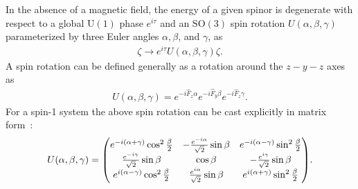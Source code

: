 In the absence of a magnetic field, the energy of a given spinor is degenerate
with respect to a global \(\text{U}(1)\) phase \(e^{i\tau}\) and an
\(\text{SO}(3)\) spin rotation \(U(\alpha, \beta, \gamma)\) parameterized by
three Euler angles \(\alpha, \beta \), and \(\gamma \), as
\begin{align}
    \zeta \rightarrow e^{i\tau}U(\alpha, \beta, \gamma)\zeta.
\end{align}
A spin rotation can be defined generally as a rotation around the \(z-y-z\) axes
as
\begin{align}\label{eq: general-spin-rot}
    U(\alpha, \beta, \gamma) = e^{-i\hat{F}_z\alpha}e^{-i\hat{F}_y\beta}
    e^{-i\hat{F}_z\gamma}.
\end{align}
For a spin-1 system the above spin rotation can be cast explicitly in matrix
form~\cite{Kawaguchi2012}:
\begin{align}\label{eq: spin1-rotation-matrix}
    U(\alpha, \beta, \gamma) = \mqty(
    e^{-i(\alpha + \gamma)}\cos^2\frac{\beta}{2} &
    -\frac{e^{-i\alpha}}{\sqrt{2}}\sin\beta &
    e^{-i(\alpha - \gamma)}\sin^2\frac{\beta}{2} \\
    \frac{e^{-i\gamma}}{\sqrt{2}}\sin\beta &
    \cos\beta &
    -\frac{e^{i\gamma}}{\sqrt{2}}\sin\beta \\
    e^{i(\alpha - \gamma)}\cos^2\frac{\beta}{2} &
    \frac{e^{i\alpha}}{\sqrt{2}}\sin\beta &
    e^{i(\alpha + \gamma)}\sin^2\frac{\beta}{2}
    ).
\end{align}

